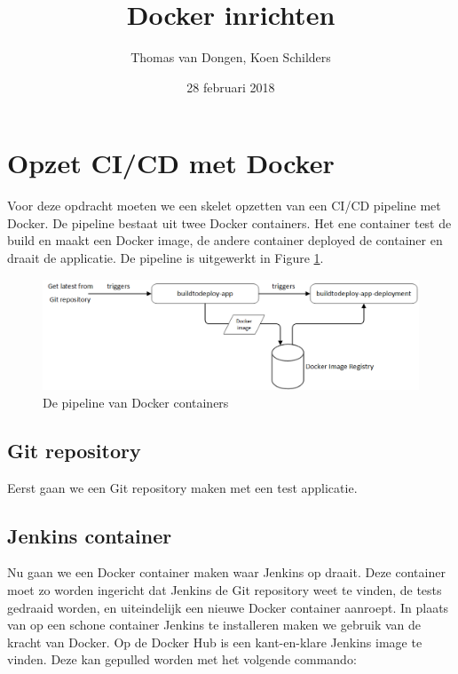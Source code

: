 \documentclass[12pt]{article}
\title{Docker inrichten}
\author{Thomas van Dongen, Koen Schilders}
\date{28 februari 2018}
\begin{document}
\begin{titlepage}
\maketitle
\end{titlepage}



\section{Opzet CI/CD met Docker}
Voor deze opdracht moeten we een skelet opzetten van een CI/CD pipeline met Docker. De pipeline bestaat uit twee Docker containers. Het ene container test de build en maakt een Docker image, de andere container deployed de container en draait de applicatie. De pipeline is uitgewerkt in Figure \ref{fig:cicd_pipeline}.
\newline
\begin{figure}[H]
	\includegraphics[width=\textwidth]{images/DockerPipeline.png}
	\caption{De pipeline van Docker containers\label{fig:cicd_pipeline}}
\end{figure}

\subsection{Git repository}
Eerst gaan we een Git repository maken met een test applicatie.


\subsection{Jenkins container}
Nu gaan we een Docker container maken waar Jenkins op draait. Deze container moet zo worden ingericht dat Jenkins de Git repository weet te vinden, de tests gedraaid worden, en uiteindelijk een nieuwe Docker container aanroept.
\linebreak
In plaats van op een schone container Jenkins te installeren maken we gebruik van de kracht van Docker. Op de Docker Hub is een kant-en-klare Jenkins image te vinden. Deze kan gepulled worden met het volgende commando:
\end{document}

